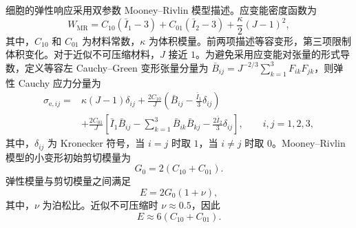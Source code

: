 细胞的弹性响应采用双参数 Mooney--Rivlin 模型描述。应变能密度函数为
\begin{equation}
W_{\mathrm{MR}}
=
C_{10}\left(\bar I_1-3\right)
+
C_{01}\left(\bar I_2-3\right)
+
\frac{\kappa}{2}\left(J-1\right)^2,
\label{eq:ch2_mooney_rivlin}
\end{equation}
其中，$C_{10}$ 和 $C_{01}$ 为材料常数，$\kappa$ 为体积模量。前两项描述等容变形，第三项限制体积变化。对于近似不可压缩材料，$J$ 接近 $1$\cite{mooney1940large,rivlin1948large}。为避免采用应变能对张量的形式导数，定义等容左 Cauchy--Green 变形张量分量为 $\bar B_{ij}=J^{-2/3}\sum_{k=1}^{3}F_{ik}F_{jk}$，则弹性 Cauchy 应力分量为
\begin{equation}
\begin{aligned}
\sigma_{\mathrm e,ij}
={}&
\kappa\left(J-1\right)\delta_{ij}
+
\frac{2C_{10}}{J}
\left(
\bar B_{ij}
-
\frac{\bar I_1}{3}\delta_{ij}
\right)
\\
&+
\frac{2C_{01}}{J}
\left[
\bar I_1\bar B_{ij}
-
\sum_{k=1}^{3}\bar B_{ik}\bar B_{kj}
-
\frac{2\bar I_2}{3}\delta_{ij}
\right],
\qquad i,j=1,2,3,
\end{aligned}
\label{eq:ch2_hyperelastic_stress}
\end{equation}
其中，$\delta_{ij}$ 为 Kronecker 符号，当 $i=j$ 时取 $1$，当 $i\ne j$ 时取 $0$。Mooney--Rivlin 模型的小变形初始剪切模量为
\begin{equation}
G_0=2\left(C_{10}+C_{01}\right).
\label{eq:ch2_initial_shear_modulus}
\end{equation}
弹性模量与剪切模量之间满足
\begin{equation}
E=2G_0(1+\nu),
\label{eq:ch2_elastic_shear_relation}
\end{equation}
其中，$\nu$ 为泊松比。近似不可压缩时 $\nu\approx0.5$，因此
\begin{equation}
E\approx6\left(C_{10}+C_{01}\right).
\label{eq:ch2_mr_modulus_relation}
\end{equation}


